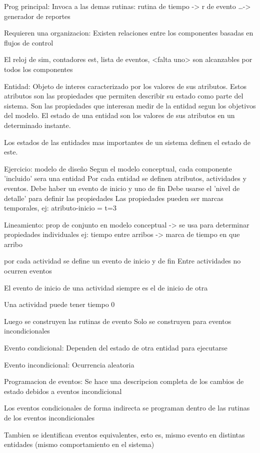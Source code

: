 \documentclass[a4paper]{article}
\begin{document}
Prog principal:
Invoca a las demas rutinas: rutina de tiempo -> r de evento \ldots -> generador de reportes

Requieren una organizacion:
Existen relaciones entre los componentes basadas en flujos de control

El reloj de sim, contadores est, lista de eventos, <falta uno> son alcanzables por todos los 
componentes 

Entidad:
Objeto de interes caracterizado por los valores de sus atributos. Estos atributos son las
propiedades que permiten describir su estado como parte del sistema. Son las propiedades
que interesan medir de la entidad segun los objetivos del modelo.
El estado de una entidad son los valores de sus atributos en un determinado instante.

Los estados de las entidades mas importantes de un sistema definen el estado de este.

Ejercicio: modelo de diseño
Segun el modelo conceptual, cada componente 'incluido' sera una entidad
Por cada entidad se definen atributos, actividades y eventos. Debe haber un evento de inicio
y uno de fin
Debe usarse el 'nivel de detalle' para definir las propiedades
Las propiedades pueden ser marcas temporales, ej: atributo-inicio = t=3

Lineamiento:
prop de conjunto en modelo conceptual -> se usa para determinar propiedades individuales
ej: tiempo entre arribos -> marca de tiempo en que arribo

por cada actividad se define un evento de inicio y de fin
Entre actividades no ocurren eventos

El evento de inicio de una actividad siempre es el de inicio de otra

Una actividad puede tener tiempo 0

Luego se construyen las rutinas de evento
Solo se construyen para eventos incondicionales

Evento condicional:
Dependen del estado de otra entidad para ejecutarse

Evento incondicional:
Ocurrencia aleatoria

Programacion de eventos:
Se hace una descripcion completa de los cambios de estado debidos a eventos incondicional

Los eventos condicionales de forma indirecta se programan dentro de las rutinas de los 
eventos incondicionales

Tambien se identifican eventos equivalentes, esto es, mismo evento en distintas entidades
(mismo comportamiento en el sistema)
\end{document}
